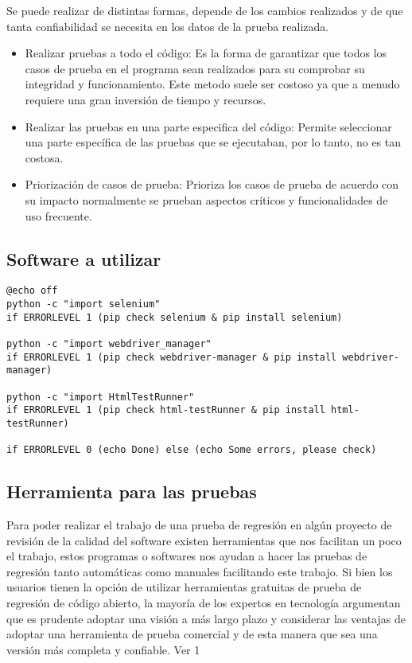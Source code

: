 \documentclass[conference]{IEEEtran}
\begin{document}
Se puede realizar de distintas formas, depende de los cambios realizados y de que tanta confiabilidad se necesita en los datos de la prueba realizada.

\begin{itemize}

\item Realizar pruebas a todo el código: Es la forma de garantizar que todos los casos de prueba en el programa sean realizados para su comprobar su integridad y funcionamiento. Este metodo suele ser costoso ya que a menudo requiere una gran inversión de tiempo y recursos.


\item Realizar las pruebas en una parte especifica del código:   
Permite seleccionar una parte específica de las pruebas que se ejecutaban, por lo tanto, no es tan costosa.

\item Priorización de casos de prueba: Prioriza los casos de prueba de acuerdo con su impacto normalmente se prueban aspectos críticos y funcionalidades de uso frecuente.

\end{itemize}


\subsection{Software a utilizar}

\begin{lstlisting}[style=CMD]
@echo off
python -c "import selenium"
if ERRORLEVEL 1 (pip check selenium & pip install selenium)

python -c "import webdriver_manager"
if ERRORLEVEL 1 (pip check webdriver-manager & pip install webdriver-manager)

python -c "import HtmlTestRunner"
if ERRORLEVEL 1 (pip check html-testRunner & pip install html-testRunner)

if ERRORLEVEL 0 (echo Done) else (echo Some errors, please check)
\end{lstlisting}

\subsection{Herramienta para las pruebas}

Para poder realizar el trabajo de una prueba de regresión en algún proyecto de revisión de la calidad del software existen herramientas que nos facilitan un poco el trabajo, estos programas o softwares nos ayudan a hacer las pruebas de regresión tanto automáticas como manuales facilitando este trabajo.
Si bien los usuarios tienen la opción de utilizar herramientas gratuitas de prueba de regresión de código abierto, la mayoría de los expertos en tecnología argumentan que es prudente adoptar una visión a más largo plazo y considerar las ventajas de adoptar una herramienta de prueba comercial y de esta manera que sea una versión más completa y confiable. Ver 1
\end{document}
